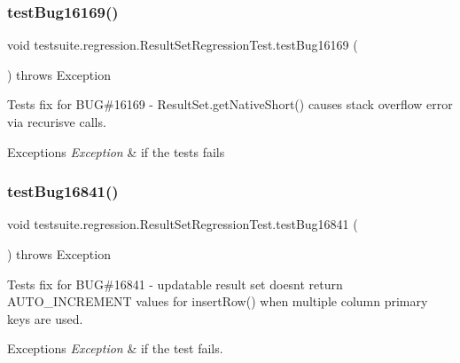 \subsubsection{\texorpdfstring{test\+Bug16169()}{testBug16169()}}
{\footnotesize\ttfamily void testsuite.\+regression.\+Result\+Set\+Regression\+Test.\+test\+Bug16169 (\begin{DoxyParamCaption}{ }\end{DoxyParamCaption}) throws Exception}

Tests fix for B\+UG\#16169 -\/ Result\+Set.\+get\+Native\+Short() causes stack overflow error via recurisve calls.


\begin{DoxyExceptions}{Exceptions}
{\em Exception} & if the tests fails \\
\hline
\end{DoxyExceptions}
\mbox{\label{classtestsuite_1_1regression_1_1_result_set_regression_test_ad9be7ab34170c6249e0de5467279a59c}} 
\subsubsection{\texorpdfstring{test\+Bug16841()}{testBug16841()}}
{\footnotesize\ttfamily void testsuite.\+regression.\+Result\+Set\+Regression\+Test.\+test\+Bug16841 (\begin{DoxyParamCaption}{ }\end{DoxyParamCaption}) throws Exception}

Tests fix for B\+UG\#16841 -\/ updatable result set doesn\textquotesingle{}t return A\+U\+T\+O\+\_\+\+I\+N\+C\+R\+E\+M\+E\+NT values for insert\+Row() when multiple column primary keys are used.


\begin{DoxyExceptions}{Exceptions}
{\em Exception} & if the test fails. \\
\hline
\end{DoxyExceptions}
\mbox{\label{classtestsuite_1_1regression_1_1_result_set_regression_test_a3f4bf90b85397d484d4ca1e59e7700da}} 

